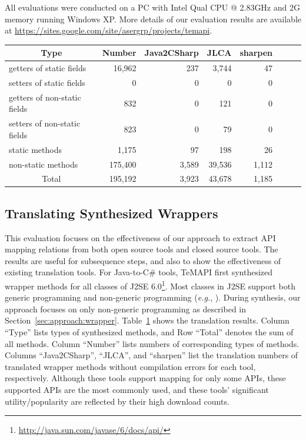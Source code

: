 All evaluations were conducted on a PC with Intel Qual CPU @ 2.83GHz and 2G memory running Windows XP. More details
of our evaluation results are available at \url{https://sites.google.com/site/asergrp/projects/temapi}.
\begin{table}[t]
\centering
\begin{SmallOut}
\begin {tabular} {|l|r|r|r|r|r|r|r|}
 \hline
\multicolumn{1}{|c}{\textbf{Type}}& \multicolumn{1}{|c|}{\textbf{Number}}
& \multicolumn{1}{|c|}{\textbf{Java2CSharp}} & \multicolumn{1}{|c|}{\textbf{JLCA}}& \multicolumn{1}{|c|}{\textbf{sharpen}} \\
\hline
getters of static fields      & 16,962 &   237 &  3,744 &  47 \\
\hline
setters of static fields      & 0      & 0     & 0      & 0  \\
\hline
getters of non-static fields  & 832    & 0    &   121  &  0  \\
\hline
setters of non-static fields  & 823    & 0    &   79   &  0   \\
\hline
static methods                & 1,175   & 97   &  198  &  26  \\
\hline
non-static methods            & 175,400 &3,589 &  39,536& 1,112  \\
\hline
\multicolumn{1}{|c|}{Total}   & 195,192 & 3,923 & 43,678 & 1,185\\
\hline
\end{tabular}%
 \label{table:java2csharp}
\end{SmallOut}\vspace*{-6ex}
\end{table}

\subsection{Translating Synthesized Wrappers}
\label{sec:evaluation:element}
This evaluation focuses on the effectiveness of our approach to extract API mapping relations from both open source tools and closed source tools. The results are useful for subsequence steps, and also to show the effectiveness of existing translation tools. For Java-to-C\# tools, TeMAPI first synthesized wrapper methods for all classes of J2SE 6.0\footnote{\url{http://java.sun.com/javase/6/docs/api/}}. Most classes in J2SE support both generic programming and non-generic programming (\emph{e.g.}, ). During synthesis, our approach focuses on only non-generic programming as described in Section~\ref{sec:approach:wrapper}. Table~\ref{table:java2csharp} shows the translation results. Column ``Type'' lists types of synthesized methods, and Row ``Total'' denotes the sum of all methods. Column ``Number'' lists numbers of corresponding types of methods. Columns ``Java2CSharp'', ``JLCA'', and ``sharpen'' list the translation numbers of translated wrapper methods without compilation errors for each tool, respectively. Although these tools support mapping for only some APIs, these supported APIs are the most commonly used, and these tools' significant utility/popularity are reflected by their high download counts.

